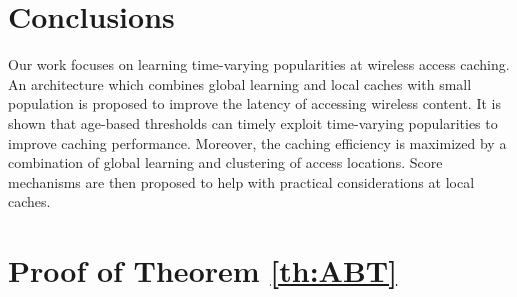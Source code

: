 \documentclass[10pt, conference, letterpaper]{IEEEtran}
\begin{document}
\section{Conclusions}
Our work focuses on learning time-varying popularities at wireless access caching.
An architecture which combines global learning and local caches with small population is proposed to improve the latency of accessing wireless content.
It is shown that age-based thresholds can timely exploit time-varying popularities to improve caching performance. Moreover, the caching efficiency is maximized by a combination of global learning and clustering of access locations. Score mechanisms are then proposed to help with practical considerations at local caches.



















\appendices

\section{Proof of Theorem \ref{th:ABT}}\label{app:a}
\end{document}
